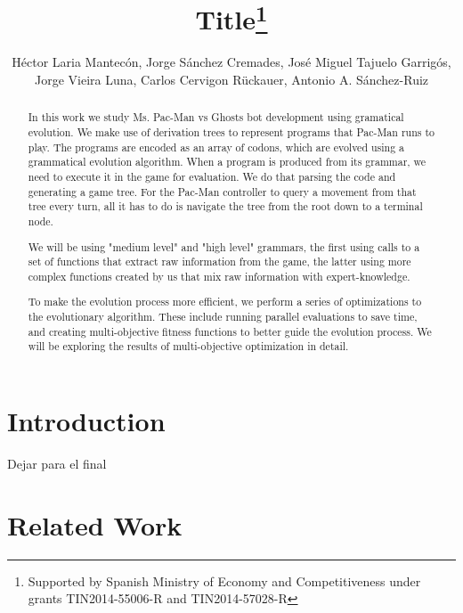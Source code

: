\documentclass{llncs}
\title{Title\thanks{Supported by Spanish Ministry of Economy and Competitiveness under grants TIN2014-55006-R and TIN2014-57028-R}
}
\author{Héctor Laria Mantecón, Jorge Sánchez Cremades, José Miguel Tajuelo Garrigós, Jorge Vieira Luna, Carlos Cervigon Rückauer, Antonio A. S\'{a}nchez-Ruiz}
\institute{
	Dep. Ingenier\'{\i}a del Software e Inteligencia Artificial \\
	Universidad Complutense de Madrid (Spain) \\
	\email{\{hlaria, jorsan06, jtajuelo, jovieira, ccervigon, antsanch\}@ucm.es}
}
\begin{document}
\maketitle
%
%
\begin{abstract}
In this work we study Ms. Pac-Man vs Ghosts bot development using gramatical evolution. We make use of derivation trees to represent programs that Pac-Man runs to play. The programs are encoded as an array of codons, which are evolved using a grammatical evolution algorithm.
When a program is produced from its grammar, we need to execute it in the game for evaluation. We do that parsing the code and generating a game tree. For the Pac-Man controller to query a movement from that tree every turn, all it has to do is navigate the tree from the root down to a terminal node.

We will be using "medium level" and "high level" grammars, the first using calls to a set of functions that extract raw information from the game, the latter using more complex functions created by us that mix raw information with expert-knowledge. 

To make the evolution process more efficient, we perform a series of optimizations to the evolutionary algorithm. These include running parallel evaluations to save time, and creating multi-objective fitness functions to better guide the evolution process. We will be exploring the results of multi-objective optimization in detail.

\end{abstract}

%
\section{Introduction}
\label{sec:intro}
%

{\color{red}Dejar para el final}

%
\section{Related Work}
\label{sec:relatedWork}
%
\end{document}
